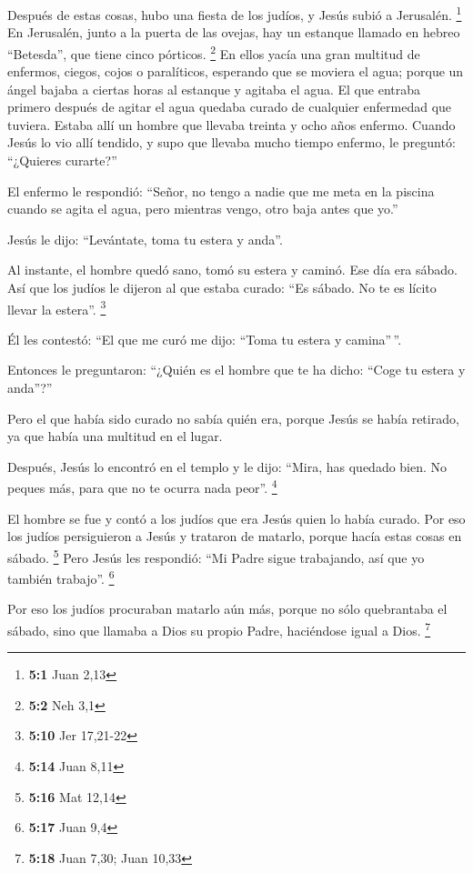 \begin{paracol}{2}
 Después de estas cosas, hubo una fiesta de los judíos, y
Jesús subió a Jerusalén. \footnote{\textbf{5:1} Juan 2,13}
 En Jerusalén, junto a la puerta de las ovejas, hay un
estanque llamado en hebreo ``Betesda'', que tiene cinco pórticos.
\footnote{\textbf{5:2} Neh 3,1}  En ellos yacía una gran
multitud de enfermos, ciegos, cojos o paralíticos, esperando que se
moviera el agua;  porque un ángel bajaba a ciertas horas
al estanque y agitaba el agua. El que entraba primero después de agitar
el agua quedaba curado de cualquier enfermedad que tuviera.
 Estaba allí un hombre que llevaba treinta y ocho años
enfermo.  Cuando Jesús lo vio allí tendido, y supo que
llevaba mucho tiempo enfermo, le preguntó: ``¿Quieres curarte?''

 El enfermo le respondió: ``Señor, no tengo a nadie que me
meta en la piscina cuando se agita el agua, pero mientras vengo, otro
baja antes que yo.''

 Jesús le dijo: ``Levántate, toma tu estera y anda''.

 Al instante, el hombre quedó sano, tomó su estera y
caminó. Ese día era sábado.  Así que los judíos le
dijeron al que estaba curado: ``Es sábado. No te es lícito llevar la
estera''. \footnote{\textbf{5:10} Jer 17,21-22}

 Él les contestó: ``El que me curó me dijo: ``Toma tu
estera y camina''\,''.

 Entonces le preguntaron: ``¿Quién es el hombre que te ha
dicho: ``Coge tu estera y anda''?''

 Pero el que había sido curado no sabía quién era, porque
Jesús se había retirado, ya que había una multitud en el lugar.

 Después, Jesús lo encontró en el templo y le dijo:
``Mira, has quedado bien. No peques más, para que no te ocurra nada
peor''. \footnote{\textbf{5:14} Juan 8,11}

 El hombre se fue y contó a los judíos que era Jesús
quien lo había curado.  Por eso los judíos persiguieron a
Jesús y trataron de matarlo, porque hacía estas cosas en sábado.
\footnote{\textbf{5:16} Mat 12,14}  Pero Jesús les
respondió: ``Mi Padre sigue trabajando, así que yo también trabajo''.
\footnote{\textbf{5:17} Juan 9,4}

 Por eso los judíos procuraban matarlo aún más, porque no
sólo quebrantaba el sábado, sino que llamaba a Dios su propio Padre,
haciéndose igual a Dios. \footnote{\textbf{5:18} Juan 7,30; Juan 10,33}


\end{paracol}
